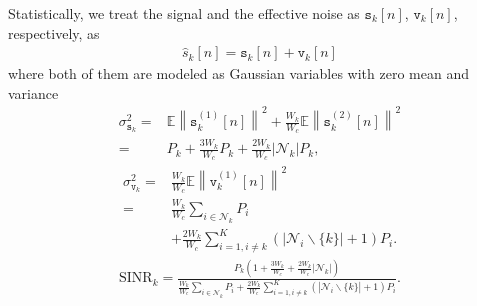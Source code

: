 \documentclass{IEEEtran}
\begin{document}
Statistically, we treat the signal and the effective noise as $\mathtt{s}_k[n]$, $\mathtt{v}_k[n]$, respectively, as
\begin{align}
\hat{s}_{k}[n] = \mathtt{s}_k[n]+\mathtt{v}_k[n]
\label{eq:s_hat}
\end{align}
where both of them are modeled as Gaussian variables with zero mean and variance
\begin{align}
\sigma^2_{\mathtt{s}_k} = &\mathbb{E}\left\|\mathtt{s}^{(1)}_k[n]\right\|^2+\frac{W_k}{W_c}\mathbb{E}\left\|\mathtt{s}^{(2)}_k[n]\right\|^2\nonumber\\
= &P_{k}+\frac{3W_k}{W_c}P_k+\frac{2W_k}{W_c}\left|\mathcal{N}_k\right|P_k,
\label{eq:power_s}
\end{align}
\begin{align}
\sigma^2_{\mathtt{v}_k} = &\frac{W_k}{W_c}\mathbb{E}\left\|\mathtt{v}^{(1)}_k[n]\right\|^2\nonumber\\
=& \frac{W_k}{W_c}\sum\limits_{i\in\mathcal{N}_k}P_i\nonumber\\
&+\frac{2W_k}{W_c}\sum\limits_{i=1,i\neq k}^{K}\left(\left|\mathcal{N}_i\backslash\{k\}\right|+1\right)P_i.
\label{eq:power_n_int}
\end{align}
\onecolumn
\begin{align}
\text{SINR}_{k} 
= \frac{P_{k}\left(1+\frac{3W_k}{W_c}+\frac{2W_k}{W_c}\left|\mathcal{N}_k\right|\right)}{\frac{W_k}{W_c}\sum\limits_{i\in \mathcal{N}_k}P_i+\frac{2W_k}{W_c}\sum\limits_{i=1,i\neq k}^{K}\left(\left|\mathcal{N}_i\backslash\{k\}\right|+1\right)P_i}.
\label{eq:power_n_int}
\end{align}

\end{document}

